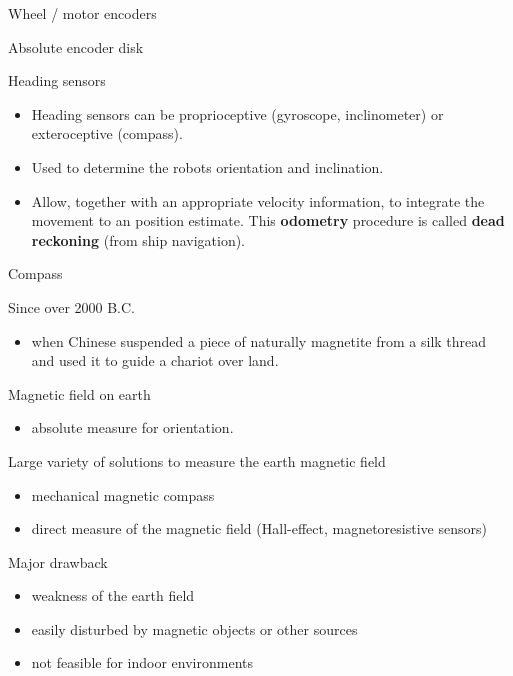 \documentclass[compress]{beamer}
\begin{document}
\begin{frame}{Wheel / motor encoders}
\begin{multicols}{2}
        Absolute encoder disk

    \end{multicols}

\end{frame}

\begin{frame}{Heading sensors}

    \begin{itemize}
        \item Heading sensors can be proprioceptive (gyroscope, inclinometer) or
            exteroceptive (compass).

        \item Used to determine the robots orientation and inclination.

        \item Allow, together with an appropriate velocity information, to integrate the
            movement to an position estimate. This {\bf odometry} procedure is called
            {\bf dead reckoning} (from ship navigation).

    \end{itemize}
\end{frame}

\begin{frame}{Compass}

Since over 2000 B.C.

\begin{itemize}

\item
  when Chinese suspended a piece of naturally magnetite from a silk
  thread and used it to guide a chariot over land.
\end{itemize}

Magnetic field on earth

\begin{itemize}

\item
  absolute measure for orientation.
\end{itemize}

Large variety of solutions to measure the earth magnetic field

\begin{itemize}

\item
  mechanical magnetic compass
\item
  direct measure of the magnetic field (Hall-effect, magnetoresistive
  sensors)
\end{itemize}

Major drawback

\begin{itemize}

\item
  weakness of the earth field
\item
  easily disturbed by magnetic objects or other sources
\item
  not feasible for indoor environments
\end{itemize}

\end{frame}
\end{document}
